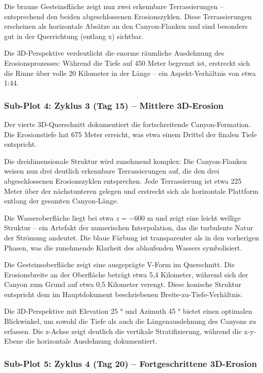 Die braune Gesteinsfläche zeigt nun zwei erkennbare Terrassierungen -- entsprechend den beiden abgeschlossenen Erosionszyklen. Diese Terrassierungen erscheinen als horizontale Absätze an den Canyon-Flanken und sind besonders gut in der Querrichtung (entlang x) sichtbar.

Die 3D-Perspektive verdeutlicht die enorme räumliche Ausdehnung des Erosionsprozesses: Während die Tiefe auf 450 Meter begrenzt ist, erstreckt sich die Rinne über volle 20 Kilometer in der Länge -- ein Aspekt-Verhältnis von etwa 1:44.

\subsubsection*{Sub-Plot 4: Zyklus 3 (Tag 15) -- Mittlere 3D-Erosion}

Der vierte 3D-Querschnitt dokumentiert die fortschreitende Canyon-Formation. Die Erosionstiefe hat 675 Meter erreicht, was etwa einem Drittel der finalen Tiefe entspricht.

Die dreidimensionale Struktur wird zunehmend komplex: Die Canyon-Flanken weisen nun drei deutlich erkennbare Terrassierungen auf, die den drei abgeschlossenen Erosionszyklen entsprechen. Jede Terrassierung ist etwa 225 Meter über der nächstunteren gelegen und erstreckt sich als horizontale Plattform entlang der gesamten Canyon-Länge.

Die Wasseroberfläche liegt bei etwa $z = -600$ m und zeigt eine leicht wellige Struktur -- ein Artefakt der numerischen Interpolation, das die turbulente Natur der Strömung andeutet. Die blaue Färbung ist transparenter als in den vorherigen Phasen, was die zunehmende Klarheit des ablaufenden Wassers symbolisiert.

Die Gesteinsoberfläche zeigt eine ausgeprägte V-Form im Querschnitt. Die Erosionsbreite an der Oberfläche beträgt etwa 5,4 Kilometer, während sich der Canyon zum Grund auf etwa 0,5 Kilometer verengt. Diese konische Struktur entspricht dem im Hauptdokument beschriebenen Breite-zu-Tiefe-Verhältnis.

Die 3D-Perspektive mit Elevation 25 ° und Azimuth 45 ° bietet einen optimalen Blickwinkel, um sowohl die Tiefe als auch die Längenausdehnung des Canyons zu erfassen. Die z-Achse zeigt deutlich die vertikale Stratifizierung, während die x-y-Ebene die horizontale Ausdehnung dokumentiert.

\subsubsection*{Sub-Plot 5: Zyklus 4 (Tag 20) -- Fortgeschrittene 3D-Erosion}

